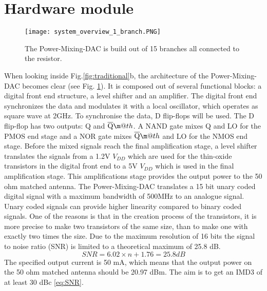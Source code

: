 \makeatletter
\newcommand*{\textoverline}[1]{$\overline{\hbox{#1}}\m@th$}
\makeatother

\section{Hardware module}\label{sec:overview}
\begin{figure}[h]
\texttt{[image: system\_overview\_1\_branch.PNG]}
\caption{The Power-Mixing-DAC is build out of 15 branches all connected to the resistor.}
\label{fig:system_overview_1branch}
\end{figure}
When looking inside Fig.\ref{fig:traditional}b, the architecture of the Power-Mixing-DAC becomes clear (see Fig. \ref{fig:system_overview_1branch}). It is composed out of several functional blocks: a digital front end structure, a level shifter and an amplifier. 
The digital front end synchronizes the data and modulates it with a local oscillator, which operates as square wave at 2GHz. To synchronise the data, D flip-flops will be used. The D flip-flop has two outputs: Q and \textoverline{Q}. A NAND gate mixes Q and LO for the PMOS end stage and a NOR gate mixes \textoverline{Q} and LO for the NMOS end stage. Before the mixed signals reach the final amplification stage, a level shifter translates the signals from a 1.2V $V_{DD}$ which are used for the thin-oxide transistors in the digital front end to a 5V $V_{DD}$ which is used in the final amplification stage. This amplifications stage provides the output power to the 50 ohm matched antenna.
The Power-Mixing-DAC translates a 15 bit unary coded digital signal with a maximum bandwidth of 500MHz to an analogue signal. Unary coded  signals can provide higher linearity compared to binary coded signals. One of the reasons is that in the creation process of the transistors, it is more precise to make two transistors of the same size, than to make one with exactly two times the size. Due to the maximum resolution of 16 bits the signal to noise ratio (SNR) is limited to a theoretical maximum of 25.8 dB.
\begin{equation}\label{eq:SNR}{SNR = 6.02 \times n + 1.76 = 25.8 dB}\end{equation}
The specified output current is 50 mA, which means that the output power on the 50 ohm matched antenna should be 20.97 dBm. The aim is to get an IMD3 of at least 30 dBc \ref{eq:SNR}.
